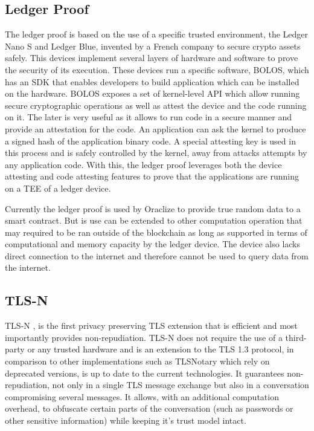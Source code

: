 \subsection{Ledger Proof}
The ledger proof is based on the use of a specific trusted environment, the Ledger Nano S and Ledger Blue, invented by a French company to secure crypto assets safely. This devices implement several layers of hardware and software to prove the security of its execution. These devices run a specific software, BOLOS, which has an SDK that enables developers to build application which can be installed on the hardware. BOLOS exposes a set of kernel-level API which allow running secure cryptographic operations as well as attest the device and the code running on it. The later is very useful as it allows to run code in a secure manner and provide an attestation for the code. An application can ask the kernel to produce a signed hash of the application binary code. A special attesting key is used in this process and is safely controlled by the kernel, away from attacks attempts by any application code. With this, the ledger proof leverages both the device attesting and code attesting features to prove that the applications are running on a TEE of a ledger device.

Currently the ledger proof is used by Oraclize to provide true random data to a smart contract. But is use can be extended to other computation operation that may required to be ran outside of the blockchain as long as supported in terms of computational and memory capacity by the ledger device. The device also lacks direct connection to the internet and therefore cannot be used to query data from the internet.


\subsection{TLS-N}
TLS-N \cite{Ritzdorf2017}, is the first privacy preserving TLS extension that is efficient and most importantly provides non-repudiation. TLS-N does not require the use of a third-party or any trusted hardware and is an extension to the TLS 1.3 protocol, in comparison to other implementations such as TLSNotary which rely on deprecated versions, is up to date to the current technologies.
It guarantees non-repudiation, not only in a single TLS message exchange but also in a conversation compromising several messages. It allows, with an additional computation overhead, to obfuscate certain parts of the conversation (such as passwords or other sensitive information) while keeping it's trust model intact.

